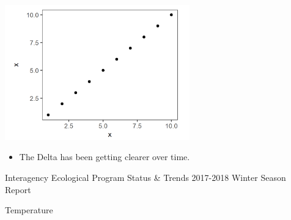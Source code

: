 \documentclass[]{article}\usepackage[]{graphicx}\usepackage[]{color}
\begin{document}
\begin{Row}
  \begin{Cell}{4}
    \begin{center}
      \includegraphics[width=8cm,align=m]{figures/secchi/placeholder_fig.png}
      \vspace{0.5cm}
      \begin{itemize}[leftmargin=1.5cm,rightmargin=1cm]
        \item The Delta has been getting clearer over time.
      \end{itemize}
    \end{center}
  \end{Cell}
\end{Row}


\newpage


\hypertarget{page:temperature}{}
\begin{Row}
  \begin{Cell}{1}
    \begin{center}
      {\Large Interagency Ecological Program Status \& Trends 2017-2018 Winter Season Report}
    \end{center}
  \end{Cell}
\end{Row}

\begin{Row}
  \begin{Cell}{1}
    \begin{center}
      {\Huge Temperature}
    \end{center}
  \end{Cell}
\end{Row}
\end{document}
